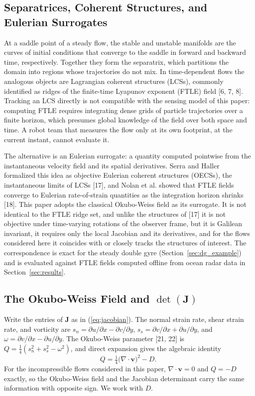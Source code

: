\documentclass[lettersize,journal]{IEEEtran}
\begin{document}
\subsection{Separatrices, Coherent Structures, and Eulerian Surrogates}
\label{sec:separatrix}

At a saddle point of a steady flow, the stable and unstable manifolds are
the curves of initial conditions that converge to the saddle in forward
and backward time, respectively. Together they form the separatrix, which
partitions the domain into regions whose trajectories do not mix. In
time-dependent flows the analogous objects are Lagrangian coherent
structures (LCSs), commonly identified as ridges of the finite-time
Lyapunov exponent (FTLE) field [6, 7, 8]. Tracking an LCS directly is not
compatible with the sensing model of this paper: computing FTLE requires
integrating dense grids of particle trajectories over a finite horizon,
which presumes global knowledge of the field over both space and time. A
robot team that measures the flow only at its own footprint, at the
current instant, cannot evaluate it.

The alternative is an Eulerian surrogate: a quantity computed pointwise
from the instantaneous velocity field and its spatial derivatives. Serra
and Haller formalized this idea as objective Eulerian coherent structures
(OECSs), the instantaneous limits of LCSs [17], and Nolan et al. showed
that FTLE fields converge to Eulerian rate-of-strain quantities as the
integration horizon shrinks [18]. This paper adopts the classical
Okubo-Weiss field as its surrogate. It is not identical to the FTLE ridge
set, and unlike the structures of [17] it is not objective under
time-varying rotations of the observer frame, but it is Galilean
invariant, it requires only the local Jacobian and its derivatives, and
for the flows considered here it coincides with or closely tracks the
structures of interest. The correspondence is exact for the steady double
gyre (Section~\ref{sec:dg_example}) and is evaluated against FTLE fields
computed offline from ocean radar data in Section~\ref{sec:results}.

\subsection{The Okubo-Weiss Field and $\det(\mathbf{J})$}

Write the entries of $\mathbf{J}$ as in (\ref{eq:jacobian}). The normal
strain rate, shear strain rate, and vorticity are
$s_n = \partial u/\partial x - \partial v/\partial y$,
$s_s = \partial v/\partial x + \partial u/\partial y$, and
$\omega = \partial v/\partial x - \partial u/\partial y$. The Okubo-Weiss
parameter [21, 22] is $Q = \tfrac{1}{4}(s_n^2 + s_s^2 - \omega^2)$, and
direct expansion gives the algebraic identity
\begin{equation}
    Q = \tfrac{1}{4}\bigl(\nabla \cdot \mathbf{v}\bigr)^2 - D.
    \label{eq:okubo_weiss}
\end{equation}
For the incompressible flows considered in this paper,
$\nabla \cdot \mathbf{v} = 0$ and $Q = -D$ exactly, so the Okubo-Weiss
field and the Jacobian determinant carry the same information with
opposite sign. We work with $D$.
\end{document}
